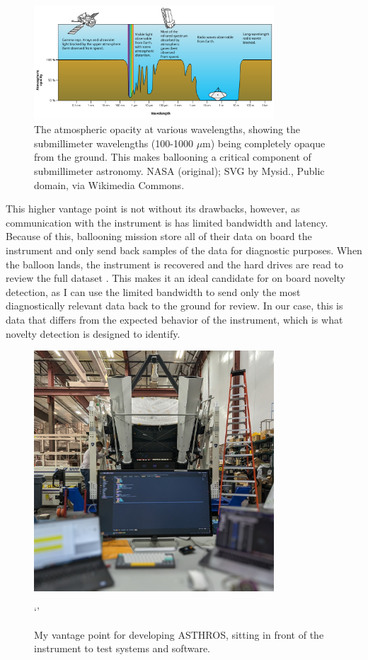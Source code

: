 \begin{figure}
\centering
\includegraphics[width=0.8\textwidth]{figs/intro/atmosphere.png}
\caption[Atmospheric Opacity at Various Wavelengths]{
    The atmospheric opacity at various wavelengths, showing the submillimeter wavelengths (100-1000 $\mu$m) being completely opaque from the ground.
    This makes ballooning a critical component of submillimeter astronomy. NASA (original); SVG by Mysid., Public domain, via Wikimedia Commons.
    \label{intro/fig:atmosphere}
}
\end{figure}

This higher vantage point is not without its drawbacks, however, as communication with the instrument is has limited bandwidth and latency. 
Because of this, ballooning mission store all of their data on board the instrument and only send back samples of the data for diagnostic purposes.
When the balloon lands, the instrument is recovered and the hard drives are read to review the full dataset \parencite{walker_STO}.
This makes it an ideal candidate for on board novelty detection, as I can use the limited bandwidth to send only the most diagnostically relevant data back to the ground for review.
In our case, this is data that differs from the expected behavior of the instrument, which is what novelty detection is designed to identify.

\begin{figure}
\centering
\includegraphics[width=0.8\textwidth]{figs/intro/asthros_instrument.jpg}
\caption[Command Station for Software Development of ASTHROS]{
    My vantage point for developing ASTHROS, sitting in front of the instrument to test systems and software.
}`'
\label{intro/fig:asthros_instrument}
\end{figure}

